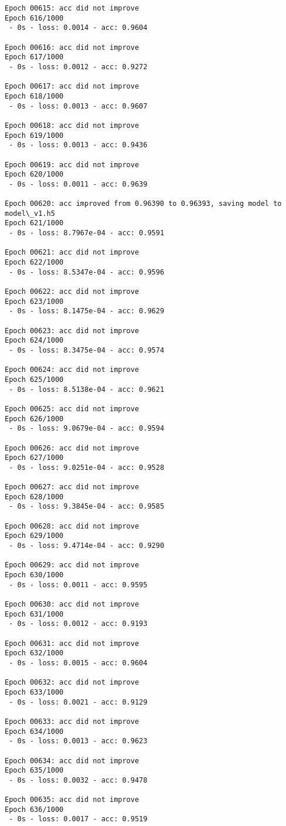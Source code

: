 \documentclass[11pt]{article}
\begin{document}
\begin{Verbatim}[commandchars=\\\{\}]
Epoch 00615: acc did not improve
Epoch 616/1000
 - 0s - loss: 0.0014 - acc: 0.9604

Epoch 00616: acc did not improve
Epoch 617/1000
 - 0s - loss: 0.0012 - acc: 0.9272

Epoch 00617: acc did not improve
Epoch 618/1000
 - 0s - loss: 0.0013 - acc: 0.9607

Epoch 00618: acc did not improve
Epoch 619/1000
 - 0s - loss: 0.0013 - acc: 0.9436

Epoch 00619: acc did not improve
Epoch 620/1000
 - 0s - loss: 0.0011 - acc: 0.9639

Epoch 00620: acc improved from 0.96390 to 0.96393, saving model to model\_v1.h5
Epoch 621/1000
 - 0s - loss: 8.7967e-04 - acc: 0.9591

Epoch 00621: acc did not improve
Epoch 622/1000
 - 0s - loss: 8.5347e-04 - acc: 0.9596

Epoch 00622: acc did not improve
Epoch 623/1000
 - 0s - loss: 8.1475e-04 - acc: 0.9629

Epoch 00623: acc did not improve
Epoch 624/1000
 - 0s - loss: 8.3475e-04 - acc: 0.9574

Epoch 00624: acc did not improve
Epoch 625/1000
 - 0s - loss: 8.5138e-04 - acc: 0.9621

Epoch 00625: acc did not improve
Epoch 626/1000
 - 0s - loss: 9.0679e-04 - acc: 0.9594

Epoch 00626: acc did not improve
Epoch 627/1000
 - 0s - loss: 9.0251e-04 - acc: 0.9528

Epoch 00627: acc did not improve
Epoch 628/1000
 - 0s - loss: 9.3845e-04 - acc: 0.9585

Epoch 00628: acc did not improve
Epoch 629/1000
 - 0s - loss: 9.4714e-04 - acc: 0.9290

Epoch 00629: acc did not improve
Epoch 630/1000
 - 0s - loss: 0.0011 - acc: 0.9595

Epoch 00630: acc did not improve
Epoch 631/1000
 - 0s - loss: 0.0012 - acc: 0.9193

Epoch 00631: acc did not improve
Epoch 632/1000
 - 0s - loss: 0.0015 - acc: 0.9604

Epoch 00632: acc did not improve
Epoch 633/1000
 - 0s - loss: 0.0021 - acc: 0.9129

Epoch 00633: acc did not improve
Epoch 634/1000
 - 0s - loss: 0.0013 - acc: 0.9623

Epoch 00634: acc did not improve
Epoch 635/1000
 - 0s - loss: 0.0032 - acc: 0.9478

Epoch 00635: acc did not improve
Epoch 636/1000
 - 0s - loss: 0.0017 - acc: 0.9519


\end{Verbatim}
\end{document}
